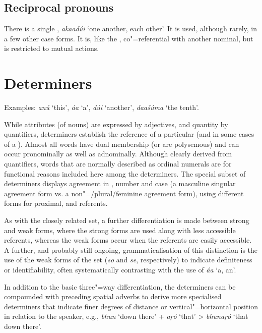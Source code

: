 \subsection{Reciprocal pronouns}
\label{subsec:3b-6-5}
There is a single , \textit{akaadúi} `one another, each other'. It is used, although rarely, in a few other case forms. It is, like the , co"=referential with another nominal, but is restricted to mutual actions.


\section{Determiners}
\label{sec:3b-7}
Examples: \textit{anú} `this', \textit{áa} `a', \textit{dúi} `another', \textit{daašúma} `the tenth'.


While attributes (of nouns) are expressed by adjectives, and quantity by quantifiers, determiners establish the reference of a particular  (and in some cases of a ). Almost all  words have dual membership (or are polysemous) and can occur pronominally as well as adnominally. Although clearly derived from quantifiers, words that are normally described as ordinal numerals are for functional reasons included here among the determiners. The special subset of  determiners displays agreement in , number and case (a  masculine singular agreement form vs. a non"=/plural/feminine agreement form), using different forms for proximal,  and  referents.


As with the closely related   set, a further differentiation is made between strong and weak forms, where the strong forms are used along with less accessible  referents, whereas the weak forms occur when the referents are easily accessible. A further, and probably still ongoing, grammaticalisation of this distinction is the use of the weak forms of the  set (\textit{so} and \textit{se}, respectively) to indicate definiteness or identifiability, often systematically contrasting with the  use of \textit{áa} `a, an'.


In addition to the basic three"=way differentiation, the  determiners can be compounded with preceding spatial adverbs to derive more specialised determiners that  indicate finer degrees of distance or vertical"=horizontal position in relation to the speaker, e.g., \textit{bhun} `down there' + \textit{aṛó} `that' > \textit{bhunaṛó} `that down there'.



